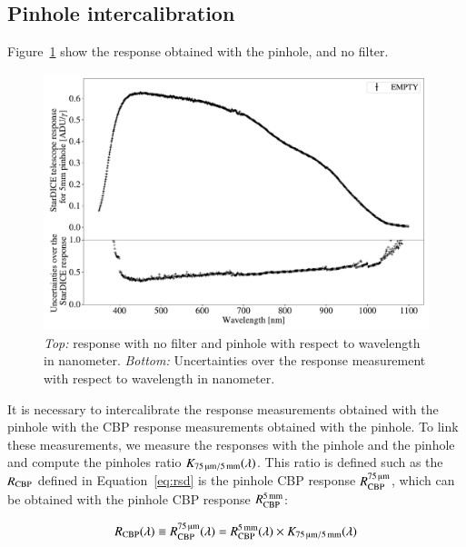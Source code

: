 \subsection{Pinhole intercalibration}

Figure~\ref{fig:stardice_5mm_response} show the \SD response obtained with the \bpinhole pinhole, and no filter.

\begin{figure}[h]
    \centering
    \includegraphics[width=\columnwidth]{fig/stardice_5mm_response.pdf}
    \caption{\textit{Top:} \SD response with no filter and \bpinhole pinhole with respect to wavelength in nanometer. \textit{Bottom:} Uncertainties over the \SD response measurement with respect to wavelength in nanometer.}
    \label{fig:stardice_5mm_response}
\end{figure}

It is necessary to intercalibrate the \SD response measurements obtained with the \spinhole pinhole with the CBP response measurements obtained with the \bpinhole pinhole. To link these measurements, we measure the \SD responses with the \spinhole pinhole and the \bpinhole pinhole and compute the pinholes ratio $K_\mathrm{\SI{75}{\micro\meter}/\SI{5}{\milli\meter}}(\lambda)$. This ratio is defined such as the $R_{\mathrm{CBP}}$ defined in Equation~\ref{eq:rsd} is the \spinhole pinhole CBP response $R_{\mathrm{CBP}}^{\SI{75}{\micro\meter}}$, which can be obtained with the \bpinhole pinhole CBP response $R_{\mathrm{CBP}}^{\SI{5}{\milli\meter}}$:

\begin{equation}
	R_{\mathrm{CBP}}(\lambda) \equiv R_{\mathrm{CBP}}^{\SI{75}{\micro\meter}}(\lambda) = R_{\mathrm{CBP}}^{\SI{5}{\milli\meter}}(\lambda) \times K_\mathrm{\SI{75}{\micro\meter}/\SI{5}{\milli\meter}}(\lambda)
\end{equation}

